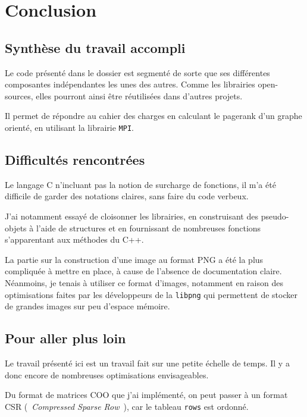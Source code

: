 \documentclass[a4paper,12pt]{article}
\begin{document}
\newpage

\section{Conclusion}

\subsection{Synthèse du travail accompli}

Le code présenté dans le dossier est segmenté de sorte que ses différentes composantes indépendantes les unes des autres. Comme les librairies open-sources, elles pourront ainsi être réutilisées dans d'autres projets.

\bigskip

Il permet de répondre au cahier des charges en calculant le pagerank d'un graphe orienté, en utilisant la librairie \texttt{MPI}.

\subsection{Difficultés rencontrées}

Le langage C n'incluant pas la notion de surcharge de fonctions, il m'a été difficile de garder des notations claires, sans faire du code verbeux.

J'ai notamment essayé de cloisonner les librairies, en construisant des pseudo-objets à l'aide de structures et en fournissant de nombreuses fonctions s'apparentant aux méthodes du C++.

\bigskip

La partie sur la construction d'une image au format PNG a été la plus compliquée à mettre en place, à cause de l'absence de documentation claire. Néanmoins, je tenais à utiliser ce format d'images, notamment en raison des optimisations faites par les développeurs de la \texttt{libpng} qui permettent de stocker de grandes images sur peu d'espace mémoire.

\subsection{Pour aller plus loin}

Le travail présenté ici est un travail fait sur une petite échelle de temps. Il y a donc encore de nombreuses optimisations envisageables.

\bigskip

Du format de matrices COO que j'ai implémenté, on peut passer à un format CSR (~\textit{Compressed Sparse Row}~), car le tableau \texttt{rows} est ordonné.
\end{document}
